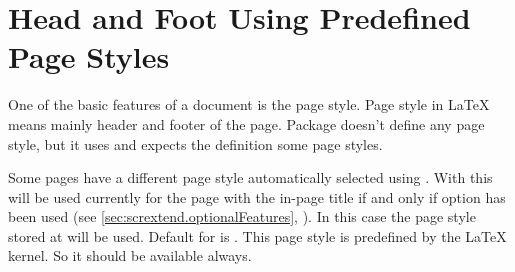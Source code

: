 


\section{Head and Foot Using Predefined Page Styles}
\label{sec:scrextend.pagestyle}

One of the basic features of a document is the page
style. Page style in \LaTeX{} means mainly header
and footer of the page. Package  doesn't define any page
style, but it uses and expects the definition some page styles.


\begin{Declaration}
\end{Declaration}%
%
%
Some pages have a different page style automatically selected using
. With  this will be used currently
for the page with the in-page title if and only if option
 has been used (see
\autoref{sec:scrextend.optionalFeatures},
). In this case the page
style stored at  will be used. Default for
 is . This page
style is predefined by the \LaTeX{} kernel. So it should be available always.%
%



